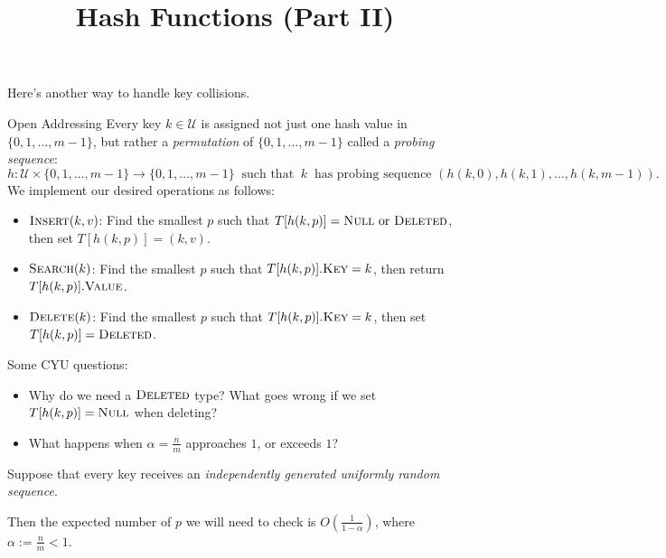 \title{Hash Functions (Part II)}



Here's another way to handle key collisions.

\begin{solution}{Open Addressing}
    Every key $k \in \mathcal{U}$ is assigned not just one hash value in $\{0, 1, \dots, m - 1\}$, but rather a \emph{permutation} of $\{0, 1, \dots, m - 1\}$ called a \emph{probing sequence}:
    \[ h: \mathcal{U} \times \{0, 1, \dots, m - 1\} \to \{0, 1, \dots, m-  1\} ~ \text{ such that } ~ k ~ \text{ has probing sequence } (h(k, 0), h(k, 1), \dots, h(k, m - 1)). \]
    We implement our desired operations as follows:
    \begin{itemize}
        \item $\textsc{Insert}(k, v)$: Find the smallest $p$ such that $T[h(k, p)] = \textsc{Null} \text{ or } \textsc{Deleted}$, then set $T[h(k, p)] = (k, v)$.
        \item $\textsc{Search}(k)$: Find the smallest $p$ such that $T[h(k, p)].\textsc{Key} = k$, then return $T[h(k, p)].\textsc{Value}$.
        \item $\textsc{Delete}(k)$: Find the smallest $p$ such that $T[h(k, p)].\textsc{Key} = k$, then set $T[h(k, p)] = \textsc{Deleted}$.
    \end{itemize}
\end{solution}

\begin{remark}
    Some CYU questions:
    \begin{itemize}
        \item Why do we need a $\textsc{Deleted}$ type?  What goes wrong if we set $T[h(k, p)] = \textsc{Null}$ when deleting?
        \item What happens when $\alpha = \frac{n}{m}$ approaches $1$, or exceeds $1$?
    \end{itemize}
\end{remark}

\begin{claim}
    Suppose that every key receives an \emph{independently generated uniformly random sequence}.
    
    Then the expected number of $p$ we will need to check is $O\left(\frac{1}{1 - \alpha}\right)$, where $\alpha := \frac{n}{m} < 1$.
\end{claim}

